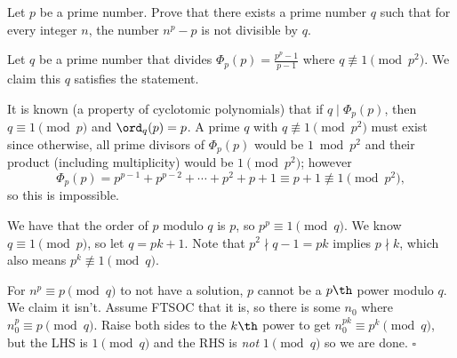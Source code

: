 
\begin{problem}
    Let $p$ be a prime number. Prove that there exists a prime number $q$ such
    that for every integer $n$, the number $n^p-p$ is not divisible by $q$.
\end{problem}

\begin{solution}[Ritwin]
    Let $q$ be a prime number that divides $\Phi_p(p) = \tfrac{p^p-1}{p-1}$
    where $q \not\equiv 1 \pmod{p^2}$. We claim this $q$ satisfies the statement.

    It is known (a property of cyclotomic polynomials) that if $q \mid \Phi_p(p)$,
    then $q \equiv 1 \pmod p$ and $\ord_q(p) = p$. A prime $q$ with
    $q \not\equiv 1 \pmod{p^2}$ must exist since otherwise, all prime divisors
    of $\Phi_p(p)$ would be $1 \bmod p^2$ and their product (including multiplicity)
    would be $1 \pmod{p^2}$; however
    \[\Phi_p(p) = p^{p-1} + p^{p-2} + \cdots + p^2 + p + 1 \equiv p+1 \not\equiv 1 \pmod{p^2},\]
    so this is impossible.

    We have that the order of $p$ modulo $q$ is $p$, so $p^p \equiv 1 \pmod q$.
    We know $q \equiv 1 \pmod p$, so let $q = pk+1$. Note that $p^2 \nmid q-1 = pk$
    implies $p \nmid k$, which also means $p^k \not\equiv 1 \pmod q$.

    For $n^p \equiv p \pmod q$ to not have a solution, $p$ cannot be a $p\th$
    power modulo $q$. We claim it isn't. Assume FTSOC that it is, so there is
    some $n_0$ where $n_0^p \equiv p \pmod q$. Raise both sides to the $k\th$
    power to get $n_0^{pk} \equiv p^k \pmod q$, but the LHS is $1 \pmod q$ and
    the RHS is \textit{not} $1 \pmod q$ so we are done. $\square$
\end{solution}